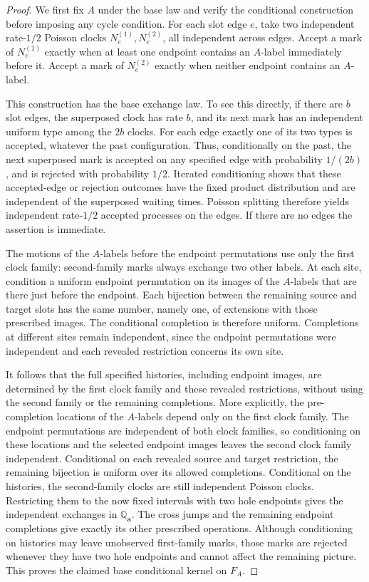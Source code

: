 \begin{proof}
We first fix \(A\) under the base law and verify the conditional
construction before imposing any cycle condition.  For each slot edge
\(e\), take two independent rate-\(1/2\) Poisson clocks
\(N_e^{(1)},N_e^{(2)}\), all independent across edges.  Accept a mark of
\(N_e^{(1)}\) exactly when at least one endpoint contains an \(A\)-label
immediately before it.  Accept a mark of \(N_e^{(2)}\) exactly when
neither endpoint contains an \(A\)-label.

This construction has the base exchange law.  To see this directly, if
there are \(b\) slot edges, the superposed clock has rate \(b\), and its
next mark has an independent uniform type among the \(2b\) clocks.
For each edge exactly one of its two types is accepted, whatever the
past configuration.  Thus, conditionally on the past, the next
superposed mark is accepted on any specified edge with probability
\(1/(2b)\), and is rejected with probability \(1/2\).  Iterated
conditioning shows that these accepted-edge or rejection outcomes have
the fixed product distribution and are independent of the superposed
waiting times.  Poisson splitting therefore yields independent
rate-\(1/2\) accepted processes on the edges.  If there are no edges the
assertion is immediate.

The motions of the \(A\)-labels before the endpoint permutations use
only the first clock family: second-family marks always exchange two
other labels.  At each site, condition a uniform endpoint permutation on
its images of the \(A\)-labels that are there just before the endpoint.
Each bijection between the remaining source and target slots has the
same number, namely one, of extensions with those prescribed images.
The conditional completion is therefore uniform.  Completions at
different sites remain independent, since the endpoint permutations
were independent and each revealed restriction concerns its own site.

It follows that the full specified histories, including endpoint
images, are determined by the first clock family and these revealed
restrictions, without using the second family or the remaining
completions.  More explicitly, the pre-completion locations of the
$A$-labels depend only on the first clock family.  The endpoint
permutations are independent of both clock families, so conditioning on
these locations and the selected endpoint images leaves the second
clock family independent.  Conditional on each revealed source and
target restriction, the remaining bijection is uniform over its
allowed completions.  Conditional on the histories, the second-family clocks
are still independent Poisson clocks.  Restricting them to the now
fixed intervals with two hole endpoints gives the independent exchanges
in \(\mathbb Q_{\mathbf a}\).  The cross jumps and the remaining
endpoint completions give exactly its other prescribed operations.
Although conditioning on histories may leave unobserved first-family
marks, those marks are rejected whenever they have two hole endpoints
and cannot affect the remaining picture.  This proves the claimed base
conditional kernel on \(F_A\).


\end{proof}
